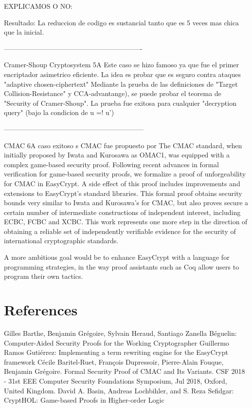 \documentclass[runningheads,a4paper]{llncs}
\begin{document}
EXPLICAMOS O NO:

Resultado: La reduccion de codigo es sustancial tanto que es 5 veces mas chica que la inicial.


-------------------------------------------------------------

Cramer-Shoup Cryptosystem 5A
\cite{article5}
Este caso se hizo famoso ya que fue el primer encriptador asimetrico eficiente. La idea es probar que es seguro contra ataques "adaptive chosen-ciphertext"
Mediante la prueba de las definiciones de "Target Collision-Resistance" y CCA-advantange), se puede probar el teorema de "Security of Cramer-Shoup".
La prueba fue exitosa para cualquier "decryption query" (bajo la condicion de u =! u')

--------------------------------------------------------------

CMAC 6A caso exitoso
\cite{article7}
s
CMAC fue propuesto por 
The CMAC standard, when initially proposed by
Iwata and Kurosawa as OMAC1, was equipped with a complex
game-based security proof. Following recent advances in formal
verification for game-based security proofs, we formalize a proof
of unforgeability for CMAC in EasyCrypt. A side effect of
this proof includes improvements and extensions to EasyCrypt’s
standard libraries. This formal proof obtains security bounds
very similar to Iwata and Kurosawa’s for CMAC, but also
proves secure a certain number of intermediate constructions of
independent interest, including ECBC, FCBC and XCBC. This
work represents one more step in the direction of obtaining a
reliable set of independently verifiable evidence for the security
of international cryptographic standards.





A more ambitious goal
would be to enhance EasyCrypt with a language for programming strategies, in
the way proof assistants such as Coq allow users to program their own tactics.

\section{References}

\begin{thebibliography}{4}
Gilles Barthe, Benjamin Grégoire, Sylvain Heraud, Santiago Zanella Béguelin: Computer-Aided Security Proofs
for the Working Cryptographer
Guillermo Ramos Gutiérrez: Implementing a term rewriting
engine for the EasyCrypt framework
Cécile Baritel-Ruet, François Dupressoir, Pierre-Alain Fouque, Benjamin Grégoire. Formal Security
Proof of CMAC and Its Variants. CSF 2018 - 31st EEE Computer Security Foundations Symposium,
Jul 2018, Oxford, United Kingdom.
David A. Basin, Andreas Lochbihler, and S. Reza Sefidgar: CryptHOL: Game-based Proofs in
Higher-order Logic

\end{thebibliography}
\end{document}
